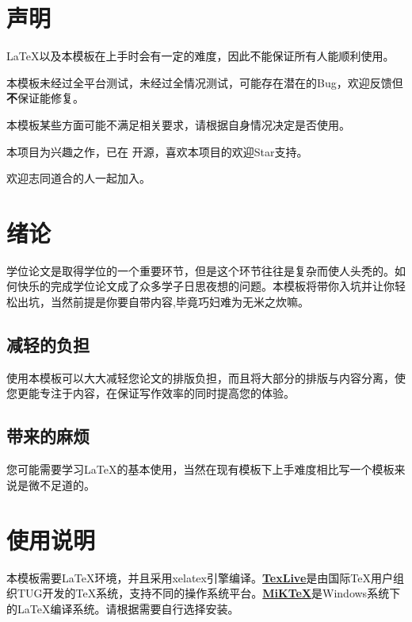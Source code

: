 \documentclass{bucthesis}
\begin{document}
\startmain
\chapter{声明}{\par
	\LaTeX{}以及本模板在上手时会有一定的难度，因此不能保证所有人能顺利使用。\par
	本模板未经过全平台测试，未经过全情况测试，可能存在潜在的Bug，欢迎反馈但\textbf{不}保证能修复。\par
	本模板某些方面可能不满足相关要求，请根据自身情况决定是否使用。\par
	本项目为兴趣之作，已在 开源，喜欢本项目的欢迎Star支持。\par
	欢迎志同道合的人一起加入。\par
	}
\chapter{绪论}{\par
	学位论文是取得学位的一个重要环节，但是这个环节往往是复杂而使人头秃的。如何快乐的完成学位论文成了众多学子日思夜想的问题。本模板将带你入坑并让你轻松出坑，当然前提是你要自带内容,毕竟巧妇难为无米之炊嘛。\par}
\section{减轻的负担}{\par
	使用本模板可以大大减轻您论文的排版负担，而且将大部分的排版与内容分离，使您更能专注于内容，在保证写作效率的同时提高您的体验。}
\section{带来的麻烦}{\par
	您可能需要学习\LaTeX{}的基本使用，当然在现有模板下上手难度相比写一个模板来说是微不足道的。}

\chapter{使用说明}{\par
	本模板需要\LaTeX{}环境，并且采用xelatex引擎编译。{\textbf{\href{http://tug.org/texlive/}{TexLive}}}是由国际TeX用户组织TUG开发的TeX系统，支持不同的操作系统平台。{\textbf{\href{https://miktex.org/}{MiKTeX}}}是Windows系统下的\LaTeX{}编译系统。请根据需要自行选择安装。}
\end{document}
